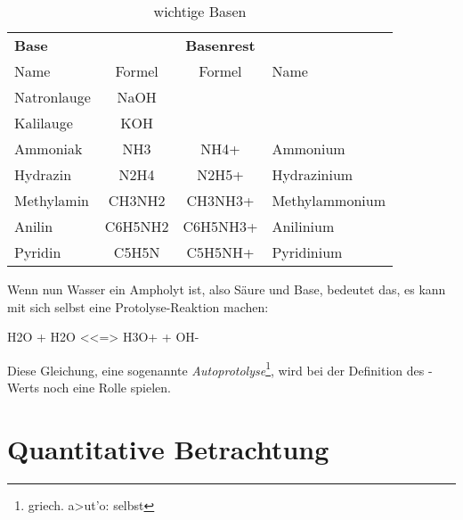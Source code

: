 \documentclass{scrartcl}
\begin{document}
\begin{table}
  \centering
  \caption{wichtige Basen}\label{tab:basen}
  \begin{tabular}{lCCl}
    \toprule
      \bfseries Base &         & \textbf{Basenrest} & \\
      Name           & Formel  & Formel             & Name \\
    \midrule
      Natronlauge    & NaOH \\
      Kalilauge      & KOH  \\
      Ammoniak       & NH3     & NH4+               & Ammonium \\
      Hydrazin       & N2H4    & N2H5+              & Hydrazinium \\
      Methylamin     & CH3NH2  & CH3NH3+            & Methylammonium \\
      Anilin         & C6H5NH2 & C6H5NH3+           & Anilinium \\
      Pyridin        & C5H5N   & C5H5NH+            & Pyridinium \\
    \bottomrule
  \end{tabular}
\end{table}

Wenn nun Wasser ein Ampholyt ist, also Säure und Base, bedeutet das, es kann
mit sich selbst eine Protolyse-Reaktion machen:
\begin{reaction}
  H2O + H2O <<=> H3O+ + OH- \label{rct:autoprotolyse}
\end{reaction}
Diese Gleichung, eine sogenannte
\emph{Autoprotolyse}\footnote{griech. \textgreek{a>ut'o}: selbst}, wird bei
der Definition des \pH-Werts noch eine Rolle spielen.

\section{Quantitative Betrachtung}
\end{document}
